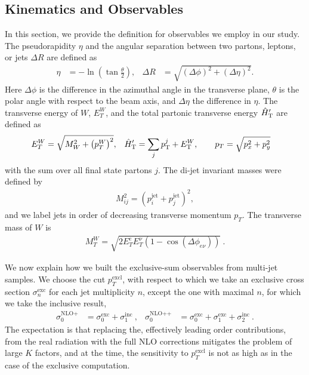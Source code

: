 \subsection{Kinematics and Observables}
\label{sec:kin}
In this section, we provide the definition for observables we employ in our study.
The pseudorapidity $\eta$ and the
angular separation between two partons, leptons, or jets $\Delta R$ are defined as
\begin{align}
  \eta &= -\ln\left(\tan\frac{\theta}{2}\right),&  \Delta R &= \sqrt{(\Delta \phi)^2+(\Delta \eta)^2}.
\end{align}
Here $\Delta\phi$ is the difference in the azimuthal angle in the transverse plane,
$\theta$ is the polar angle with respect to the beam axis, and
$\Delta\eta$ the difference in $\eta$. 
The transverse energy of $W$, $E_T^W$, and the total partonic transverse energy ${\hat H}_{\mathrm T}'$ are defined as
\begin{align}\label{eq:htpart}
  E_T^W&=\sqrt{M_W^2+\left(p_T^W \right)^2},& {\hat H}_{\mathrm T}'&=\sum_j p_{\textrm T}^j+E_{\textrm T}^W, \qquad p_T=\sqrt{p_x^2+p_y^2}
\end{align}
with the sum over all final state partons $j$.
The di-jet invariant masses were defined by
\begin{align}
  M_{ij}^2 = \left(p_i^{\text{jet}}+p_j^{\text{jet}}\right)^2,
\end{align}
and we label  jets in order of decreasing transverse momentum $p_T$. 
The transverse mass of $W$ is
\begin{align}
  M_T^W=\sqrt{2E_T^eE_T^\nu(1-\cos(\Delta\phi_{e\nu}))}\ .
\end{align}

We now explain how we built the exclusive-sum observables from multi-jet samples.
We choose the cut $p_{T}^{\text{excl}}$, with respect to which we take an exclusive cross section $\sigma^{\text{exc}}_n$
for each jet multiplicity $n$, except the one with maximal  $n$, for which we take the inclusive result,
\begin{align}\label{eq:excsums}
  \sigma^{\text{NLO+}}_0 &= \sigma^{\text{exc}}_0 + \sigma^{\text{inc}}_1\ , &
\sigma^{\text{NLO++}}_0 &= \sigma^{\text{exc}}_0 +\sigma^{\text{exc}}_1+
\sigma^{\text{inc}}_2\ .
\end{align}
The expectation is that replacing the, effectively leading order contributions, from the real radiation with the full NLO
corrections mitigates the problem of large $K$ factors, and at the time, the sensitivity to $p_{T}^{\text{excl}}$ is not as high 
as in the case of the exclusive computation.

